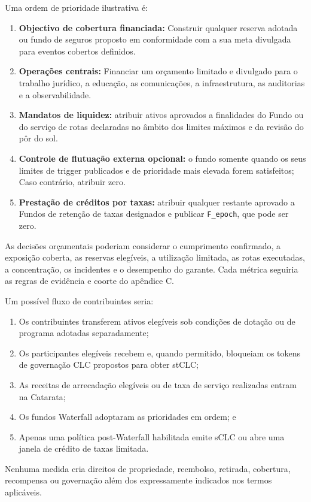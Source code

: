 \documentclass[11pt]{article}
\begin{document}
Uma ordem de prioridade ilustrativa é:

\begin{enumerate}[leftmargin=*]
\item \textbf{Objectivo de cobertura financiada:} Construir qualquer reserva adotada ou fundo de seguros proposto em conformidade com a sua meta divulgada para eventos cobertos definidos.
\item \textbf{Operações centrais:} Financiar um orçamento limitado e divulgado para o trabalho jurídico, a educação, as comunicações, a infraestrutura, as auditorias e a observabilidade.
\item \textbf{Mandatos de liquidez:} atribuir ativos aprovados a finalidades do Fundo ou do serviço de rotas declaradas no âmbito dos limites máximos e da revisão do pôr do sol.
\item \textbf{Controle de flutuação externa opcional:} o fundo somente quando os seus limites de trigger publicados e de prioridade mais elevada forem satisfeitos; Caso contrário, atribuir zero.
\item \textbf{Prestação de créditos por taxas:} atribuir qualquer restante aprovado a Fundos de retenção de taxas designados e publicar \texttt{F\_epoch}, que pode ser zero.
\end{enumerate}
As decisões orçamentais poderiam considerar o cumprimento confirmado, a exposição coberta, as reservas elegíveis, a utilização limitada, as rotas executadas, a concentração, os incidentes e o desempenho do garante. Cada métrica seguiria as regras de evidência e coorte do apêndice C.

Um possível fluxo de contribuintes seria:

\begin{enumerate}[leftmargin=*]
\item Os contribuintes transferem ativos elegíveis sob condições de dotação ou de programa adotadas separadamente;
\item Os participantes elegíveis recebem e, quando permitido, bloqueiam os tokens de governação CLC propostos para obter stCLC;
\item As receitas de arrecadação elegíveis ou de taxa de serviço realizadas entram na Catarata;
\item Os fundos Waterfall adoptaram as prioridades em ordem; e
\item Apenas uma política post-Waterfall habilitada emite sCLC ou abre uma janela de crédito de taxas limitada.
\end{enumerate}
Nenhuma medida cria direitos de propriedade, reembolso, retirada, cobertura, recompensa ou governação além dos expressamente indicados nos termos aplicáveis.
\end{document}
